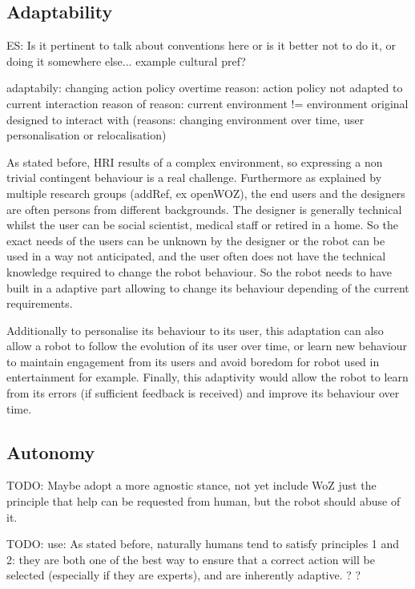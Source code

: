 	
	\subsection{Adaptability}	
	
	
	ES: Is it pertinent to talk about conventions here or is it better not to do it, or doing it somewhere else... example cultural pref?
	
	adaptabily: changing action policy overtime
	reason: action policy not adapted to current interaction
	reason of reason: current environment != environment original designed to interact with (reasons: changing environment over time, user personalisation or relocalisation)
	
	As stated before, HRI results of a complex environment, so expressing a non trivial contingent behaviour is a real challenge. Furthermore as explained by multiple research groups (addRef, ex openWOZ), the end users and the designers are often persons from different backgrounds. The designer is generally technical whilst the user can be social scientist, medical staff or retired in a home. So the exact needs of the users can be unknown by the designer or the robot can be used in a way not anticipated, and the user often does not have the technical knowledge required to change the robot behaviour. So the robot needs to have built in a adaptive part allowing to change its behaviour depending of the current requirements.
	
	Additionally to personalise its behaviour to its user, this adaptation can also allow a robot to follow the evolution of its user over time, or learn new behaviour to maintain engagement from its users and avoid boredom for robot used in entertainment for example. Finally, this adaptivity would allow the robot to learn from its errors (if sufficient feedback is received) and improve its behaviour over time.
		
		
	\subsection{Autonomy}
	
	TODO: Maybe adopt a more agnostic stance, not yet include WoZ just the principle that help can be requested from human, but the robot should abuse of it.
	
	TODO: use: As stated before, naturally humans tend to satisfy principles 1 and 2: they are both one of the best way to ensure that a correct action will be selected (especially if they are experts), and are inherently adaptive. ? ?
	
